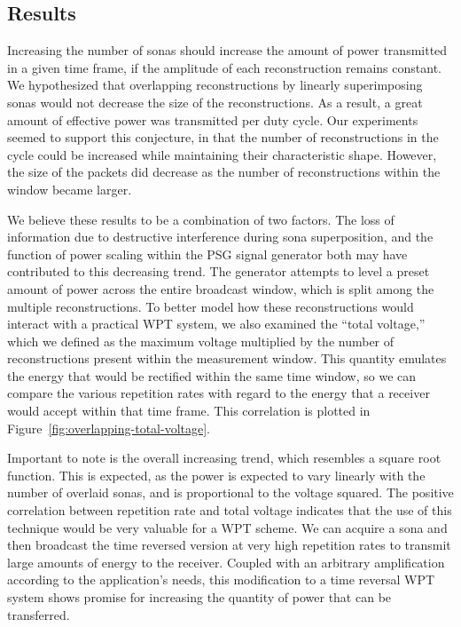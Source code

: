 \subsection{Results}

Increasing the number of sonas should increase the amount of power transmitted in a given time frame, if the amplitude of each reconstruction remains constant. We hypothesized that overlapping reconstructions by linearly superimposing sonas would not decrease the size of the reconstructions. As a result, a great amount of effective power was transmitted per duty cycle. Our experiments seemed to support this conjecture, in that the number of reconstructions in the cycle could be increased while maintaining their characteristic shape. However, the size of the packets did decrease as the number of reconstructions within the window became larger.

We believe these results to be a combination of two factors. The loss of information due to destructive interference during sona superposition, and the function of power scaling within the PSG signal generator both may have contributed to this decreasing trend. The generator attempts to level a preset amount of power across the entire broadcast window, which is split among the multiple reconstructions.
To better model how these reconstructions would interact with a practical WPT system, we also examined the ``total \ptp{} voltage,'' which we defined as the maximum \ptp{} voltage multiplied by the number of reconstructions present within the measurement window. This quantity emulates the energy that would be rectified within the same time window, so we can compare the various repetition rates with regard to the energy that a receiver would accept within that time frame. This correlation is plotted in Figure~\ref{fig:overlapping-total-voltage}.

Important to note is the overall increasing trend, which resembles a square root function. This is expected, as the power is expected to vary linearly with the number of overlaid sonas, and is proportional to the \ptp{} voltage squared. The positive correlation between repetition rate and total voltage indicates that the use of this technique would be very valuable for a WPT scheme. We can acquire a sona and then broadcast the time reversed version at very high repetition rates to transmit large amounts of energy to the receiver. Coupled with an arbitrary amplification according to the application's needs, this modification to a time reversal WPT system shows promise for increasing the quantity of power that can be transferred.

